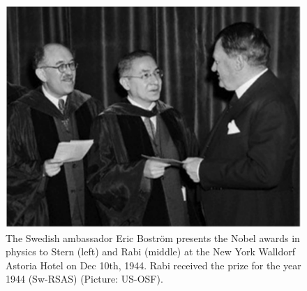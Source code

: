 \documentclass{article}
\begin{document}
%
\begin{figure}
\begin{center}
\includegraphics[scale=0.45]{figures/Nobel_SternRabi}
\caption{The Swedish ambassador Eric Boström presents the Nobel awards in physics to Stern (left) and Rabi (middle) at the New York Walldorf Astoria Hotel on Dec 10th, 1944.  Rabi received the prize for the year 1944 (Sw-RSAS) (Picture: US-OSF). }
\label{fig:Nobel_SternRabi}
\end{center}
\end{figure}
\end{document}
